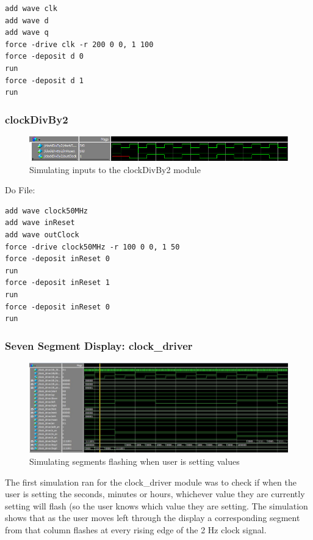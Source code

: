 \documentclass[a4paper]{article}
\begin{document}
\begin{Verbatim}
add wave clk
add wave d
add wave q
force -drive clk -r 200 0 0, 1 100
force -deposit d 0
run
force -deposit d 1
run
\end{Verbatim}

\subsubsection{clockDivBy2}

\begin{figure}[H]
    \includegraphics[width=0.8 \linewidth]{images/clockDivBy2Sim.png}
    \caption{Simulating inputs to the clockDivBy2 module}
    \label{clockDivBy2Sim}
\end{figure}

Do File:

\begin{Verbatim}
add wave clock50MHz
add wave inReset
add wave outClock
force -drive clock50MHz -r 100 0 0, 1 50
force -deposit inReset 0
run
force -deposit inReset 1
run
force -deposit inReset 0
run
\end{Verbatim}

\subsubsection{Seven Segment Display: clock_driver}

\begin{figure}[H]
    \includegraphics[width=0.8 \linewidth]{images/clock_driver_sim1.JPG}
    \caption{Simulating segments flashing when user is setting values}
    \label{clock_driver_sim1}
\end{figure}
The first simulation ran for the clock_driver module was to check if when the user is setting the seconds, minutes or hours, whichever value they are currently setting will flash (so the user knows which value they are setting. The simulation shows that as the user moves left through the display a corresponding segment from that column flashes at every rising edge of the 2 Hz clock signal.
\end{document}
